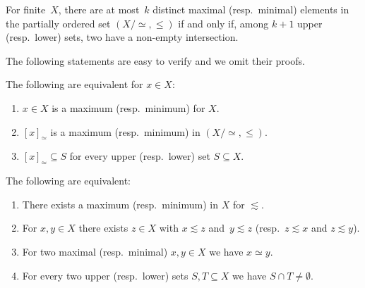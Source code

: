 \begin{corollary}  \label{prelim:order:cor:num-disj-upper}
	For finite~$X$, there are at most~$k$ distinct maximal (resp.~minimal) elements in the partially ordered set 
	$(X /{\simeq}, \le)$ if and only if, among $k+1$ upper (resp.~lower) sets, two have a non-empty intersection. 
\end{corollary}

The following statements are easy to verify and we omit their proofs.

\begin{proposition} \label{prelim:order:prop:maximum}
	The following are equivalent for $x \in X$:	
	\begin{enumerate}
		\item $x \in X$ is a maximum (resp.~minimum) for $X$.
		\item $[x]_{\simeq}$ is a maximum (resp.~minimum) in $(X / {\simeq}, \le)$. 
		\item $[x]_{\simeq} \subseteq S$ for every upper (resp.~lower) set $S \subseteq X$. %
	\end{enumerate} 	
\end{proposition}

\begin{proposition} \label{prelim:order:prop:maximum2}
	The following are equivalent:
	\begin{enumerate}		
		\item There exists a maximum  (resp.~minimum) in $X$ for $\lesssim$.
		
		\item For $x,y \in X$ there exists $z \in X$ with $x \lesssim z$ and~$y \lesssim z$ (resp.~$z \lesssim x$ and $z \lesssim y$). 
		
		\item For two maximal (resp.~minimal) $x,y \in X$ we have $x \simeq y$.
		
		\item For every two upper (resp.~lower) sets $S, T \subseteq X$ we have $S \cap T \ne \emptyset$.		
		
	\end{enumerate} 	
\end{proposition}

